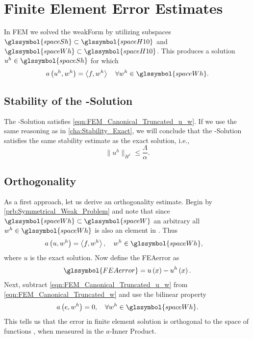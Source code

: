 \section{Finite Element Error Estimates}
In \gls{FEM} we solved the \gls{weakForm} by utilizing subspaces $\glssymbol{spaceSh} \subset \glssymbol{spaceH10}$ and
$\glssymbol{spaceWh} \subset \glssymbol{spaceH10}$. This produces a solution $u^h \in \glssymbol{spaceSh}$ for which
\begin{equation}	\label{eqn:FEM_Canonical_Truncated_u_w}
	a \left( u^h, w^h \right) = \left \langle f, w^h \right \rangle\quad \forall w^h \in \glssymbol{spaceWh}.
\end{equation}
%
\subsection[Stability of the finite element solution]{Stability of the -Solution}	\label{cha:Stability_FEM}
The -Solution satisfies \cref{eqn:FEM_Canonical_Truncated_u_w}. If we use the same reasoning as in \cref{cha:Stability_Exact},
we will conclude that the -Solution satisfies the same stability estimate as the exact solution, i.e.,
\begin{equation}	\label{eqn:Stability_FEM}
	\big\| u^h \big\|_{ H^1 } \leq  \frac{ \Lambda }{ \alpha }.
\end{equation}
%
\subsection[Orthogonality]{Orthogonality}
As a first approach, let us derive an orthogonality estimate. Begin by \cref{prb:Symmetrical_Weak_Problem} and note that since
$\glssymbol{spaceWh} \subset \glssymbol{spaceW}$ an arbitrary all $w^h \in \glssymbol{spaceWh}$ is also an element in . Thus
\begin{align}	\label{eqn:FEM_Canonical_Truncated_w}
	a \left( u, w^h \right) &= \left \langle f, w^h \right \rangle,	\quad w^h \in \glssymbol{spaceWh},
\end{align}
where $u$ is the exact solution. Now define the \gls{FEAerror} as
\begin{equation}	\label{eqn:Error_In_FEM}
		\glssymbol{FEAerror} = u \left( x \right) - u^h \left( x \right).
\end{equation}
Next, subtract \cref{eqn:FEM_Canonical_Truncated_u_w} from \cref{eqn:FEM_Canonical_Truncated_w} and use the bilinear property
\begin{equation}	\label{eqn:Error_Orthogonal_FEM}
		a \left( e, w^h \right) = 0, \quad \forall w^h \in \glssymbol{spaceWh}.
\end{equation}
This tells us that the error in finite element solution is orthogonal to the space of functions , when measured in the
$a$-Inner Product.
%
